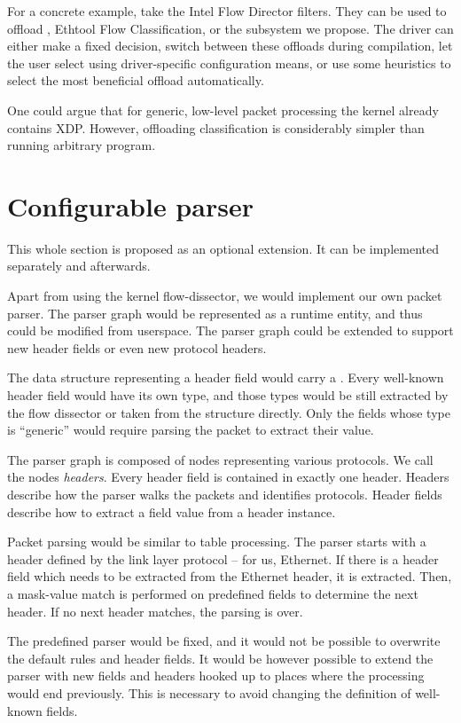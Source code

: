For a concrete example, take the Intel Flow Director filters. They can be used
to offload , Ethtool Flow Classification, or the subsystem we propose.
The driver can either make a fixed decision, switch between these offloads
during compilation, let the user select using driver-specific configuration
means, or use some heuristics to select the most beneficial offload
automatically.

One could argue that for generic, low-level packet processing the kernel
already contains \acrfull{XDP}. However, offloading classification is
considerably simpler than running arbitrary  program.

\section{Configurable parser}
\label{rfc:parser}

This whole section is proposed as an optional extension. It can be implemented
separately and afterwards.

Apart from using the kernel flow-dissector, we would implement our own packet
parser. The parser graph would be represented as a runtime entity, and thus
could be modified from userspace. The parser graph could be extended to support
new header fields or even new protocol headers.

The data structure representing a header field would carry a .
Every well-known header field would have its own type, and those types would be
still extracted by the flow dissector or taken from the \skb{} structure directly.
Only the fields whose type is ``generic'' would require parsing the packet
to extract their value.

The parser graph is composed of nodes representing various protocols. We
call the nodes \emph{headers}. Every header field is contained in exactly one header.
Headers describe how the parser walks the packets and identifies protocols.
Header fields describe how to extract a field value from a header instance.

Packet parsing would be similar to table processing. The parser
starts with a header defined by the link layer protocol -- for us, Ethernet. If there is
a header field which needs to be extracted from the Ethernet header, it is
extracted. Then, a mask-value match is performed on predefined fields to
determine the next header. If no next header matches, the parsing is over.

The predefined parser would be fixed, and it would not be possible to overwrite
the default rules and header fields. It would be however possible to extend the
parser with new fields and headers hooked up to places where the processing
would end previously. This is necessary to avoid changing the definition of
well-known fields.

